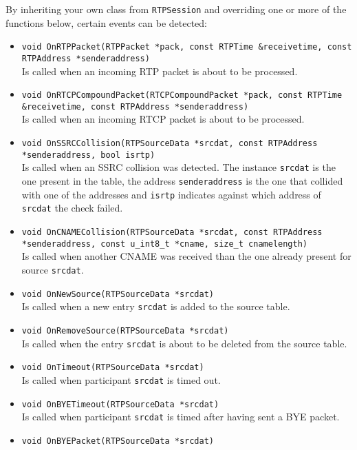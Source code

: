 \documentclass[12pt,a4paper]{article}
\begin{document}
				By inheriting your own class from {\tt RTPSession} and overriding
				one or more of the functions below, certain events can be detected:
				\begin{itemize}
					\item {\tt void OnRTPPacket(RTPPacket *pack, const RTPTime \&receivetime,
					                                    const RTPAddress *senderaddress)}\\
						Is called when an incoming RTP packet is about to be processed.
					\item {\tt void OnRTCPCompoundPacket(RTCPCompoundPacket *pack, const RTPTime \&receivetime,
					                                             const RTPAddress *senderaddress)}\\
						Is called when an incoming RTCP packet is about to be processed.
					\item {\tt void OnSSRCCollision(RTPSourceData *srcdat, const RTPAddress *senderaddress, bool isrtp)}\\
						Is called when an SSRC collision was detected. The instance
						{\tt srcdat} is the one present in the table, the address
						{\tt senderaddress} is the one that collided with one of the
						addresses and {\tt isrtp} indicates against which address of
						{\tt srcdat} the check failed.
					\item {\tt void OnCNAMECollision(RTPSourceData *srcdat, const RTPAddress *senderaddress,
					                                         const u\_int8\_t *cname, size\_t cnamelength)}\\
						Is called when another CNAME was received than the one
						already present for source {\tt srcdat}.
					\item {\tt void OnNewSource(RTPSourceData *srcdat)}\\
						Is called when a new entry {\tt srcdat} is added to the source
						table.
					\item {\tt void OnRemoveSource(RTPSourceData *srcdat)}\\
						Is called when the entry {\tt srcdat} is about to be
						deleted from the source table.
					\item {\tt void OnTimeout(RTPSourceData *srcdat)}\\
						Is called when participant {\tt srcdat} is timed out.
					\item {\tt void OnBYETimeout(RTPSourceData *srcdat)}\\
						Is called when participant {\tt srcdat} is timed after
						having sent a BYE packet.
					\item {\tt void OnBYEPacket(RTPSourceData *srcdat)}\\

\end{itemize}
\end{document}
